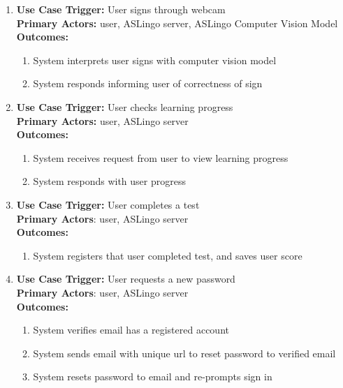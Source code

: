 \documentclass[12pt, titlepage]{article}
\begin{document}
\begin{enumerate}
      \item
      \textbf{Use Case Trigger:} User signs through webcam\\
      \textbf{Primary Actors:} user, ASLingo server, ASLingo Computer Vision Model\\
      \textbf{Outcomes:}
      \begin{enumerate}
          \item System interprets user signs with computer vision model
          \item System responds informing user of correctness of sign
      \end{enumerate}

      \item
      \textbf{Use Case Trigger:} User checks learning progress\\
      \textbf{Primary Actors:} user, ASLingo server\\
      \textbf{Outcomes:}
      \begin{enumerate}
          \item System receives request from user to view learning progress
          \item System responds with user progress
      \end{enumerate}

      \item
      \textbf{Use Case Trigger:} User completes a test\\
      \textbf{Primary Actors}: user, ASLingo server\\
      \textbf{Outcomes:}
      \begin{enumerate}
          \item System registers that user completed test, and saves user score
      \end{enumerate}

      \item
      \textbf{Use Case Trigger:} User requests a new password\\
      \textbf{Primary Actors}: user, ASLingo server\\
      \textbf{Outcomes:}
      \begin{enumerate}
          \item System verifies email has a registered account
          \item System sends email with unique url to reset password to verified email
          \item System resets password to email and re-prompts sign in
      \end{enumerate}

\end{enumerate}
\end{document}
